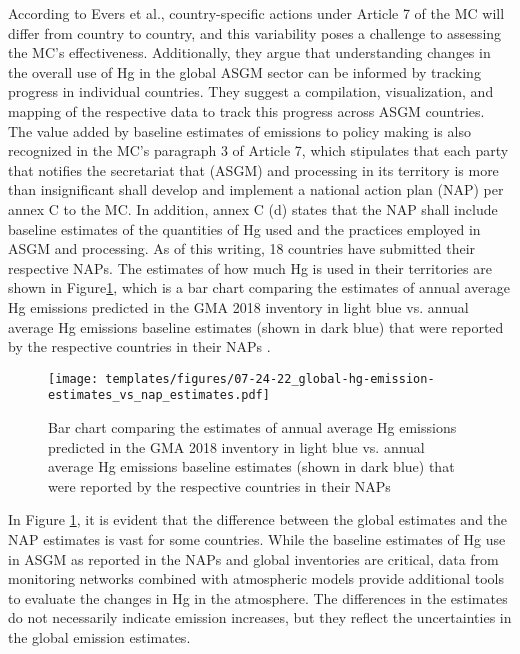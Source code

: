 According to Evers et al.\cite{evers_evaluating_2016}, country-specific actions under Article 7 of the MC will differ from country to country, and this variability poses a challenge to assessing the MC's effectiveness. Additionally, they argue that understanding changes in the overall use of Hg in the global ASGM sector can be informed by tracking progress in individual countries. They suggest a compilation, visualization, and mapping of the respective data to track this progress across ASGM countries.  The value added by baseline estimates of emissions to policy making is also recognized in the MC's paragraph 3 of Article 7, which stipulates that each party that notifies the secretariat that (ASGM) and processing in its territory is more than insignificant shall develop and implement a national action plan (NAP) per annex C to the MC. In addition, annex C (d) states that the NAP shall include baseline estimates of the quantities of Hg used and the practices employed in ASGM and processing. As of this writing, 18 countries have submitted their respective NAPs. The estimates of how much Hg is used in their territories are shown in Figure\ref{fig:global-hg-emission-estimates_vs_nap_estimates}, which is a bar chart comparing the estimates of annual average Hg emissions predicted in the GMA 2018 inventory in light blue vs. annual average Hg emissions baseline estimates (shown in dark blue) that were reported by the respective countries in their NAPs \cite{united_nations_environment_programme_technical_2019}.

\begin{figure}[H]
  \texttt{[image: templates/figures/07-24-22\_global-hg-emission-estimates\_vs\_nap\_estimates.pdf]}
  \centering
  \caption[Bar chart comparing the  GMA 2018 ASGM Hg emission estimates to NAP baseline ASGM Hg emissions estimates]{Bar chart comparing the estimates of annual average Hg emissions predicted in the GMA 2018 inventory in light blue vs. annual average Hg emissions baseline estimates (shown in dark blue) that were reported by the respective countries in their NAPs \cite{united_nations_environment_programme_technical_2019} }
  \label{fig:global-hg-emission-estimates_vs_nap_estimates}
\end{figure}
\FloatBarrier
\begin{flushleft}
 In Figure \ref{fig:global-hg-emission-estimates_vs_nap_estimates}, it is evident that the difference between the global estimates and the NAP estimates is vast for some countries. While the baseline estimates of Hg use in ASGM as reported in the NAPs and global inventories are critical, data from monitoring networks combined with atmospheric models provide additional tools to evaluate the changes in Hg in the atmosphere. The differences in the estimates do not necessarily indicate emission increases, but they reflect the uncertainties in the global emission estimates. 
\end{flushleft} 


